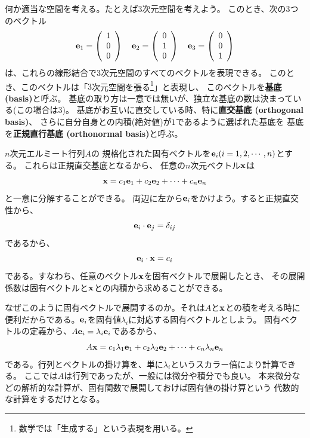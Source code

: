 何か適当な空間を考える。たとえば$3$次元空間を考えよう。
このとき、次の3つのベクトル
\begin{equation}
  {\bf e}_1 =
  \left(
  \begin{array}{c}
      1 \\ 0 \\ 0
    \end{array}
  \right)
  \quad
  {\bf e}_2 =
  \left(
  \begin{array}{c}
      0 \\ 1 \\ 0
    \end{array}
  \right)
  \quad
  {\bf e}_3 =
  \left(
  \begin{array}{c}
      0 \\ 0 \\ 1
    \end{array}
  \right)
\end{equation}
は、これらの線形結合で$3$次元空間のすべてのベクトルを表現できる。
このとき、このベクトルは「$3$次元空間を張る\footnote{
  数学では「生成する」という表現を用いる。
}」と表現し、
このベクトルを{\bf 基底 (basis)}と呼ぶ。
基底の取り方は一意では無いが、独立な基底の数は決まっている(この場合は3)。
基底がお互いに直交している時、特に{\bf 直交基底 (orthogonal basis)}、
さらに自分自身との内積(絶対値)が$1$であるように選ばれた基底を
基底を{\bf 正規直行基底 (orthonormal basis)}と呼ぶ。

$n$次元エルミート行列$A$の
規格化された固有ベクトルを${\bf e}_i (i=1,2,\cdots,n)$とする。
これらは正規直交基底となるから、
任意の$n$次元ベクトル${\bf x}$は
\begin{equation}
  {\bf x} = c_1 {\bf e}_1 + c_2 {\bf e}_2 + \cdots + c_n {\bf e}_n
\end{equation}
と一意に分解することができる。
両辺に左から${\bf e}_i$をかけよう。すると正規直交性から、
\begin{equation}
  {\bf e}_i \cdot {\bf e}_j = \delta_{ij}
\end{equation}
であるから、
\begin{equation}
  {\bf e}_i \cdot {\bf x} = c_i
\end{equation}
である。すなわち、任意のベクトル${\bf x}$を固有ベクトルで展開したとき、
その展開係数は固有ベクトルと${\bf x}$との内積から求めることができる。

なぜこのように固有ベクトルで展開するのか。それは$A$と${\bf x}$との積を考える時に
便利だからである。${\bf e}_i$を固有値$\lambda_i$に対応する固有ベクトルとしよう。
固有ベクトルの定義から、$A{\bf e}_i = \lambda_i {\bf e}_i$であるから、
\begin{equation}
  A {\bf x} = c_1 \lambda_1 {\bf e}_1 + c_2 \lambda_2 {\bf e}_2 + \cdots + c_n \lambda_n {\bf e}_n
\end{equation}
である。行列とベクトルの掛け算を、単に$\lambda_i$というスカラー倍により計算できる。
ここでは$A$は行列であったが、一般には微分や積分でも良い。
本来微分などの解析的な計算が、固有関数で展開しておけば固有値の掛け算という
代数的な計算をするだけとなる。

